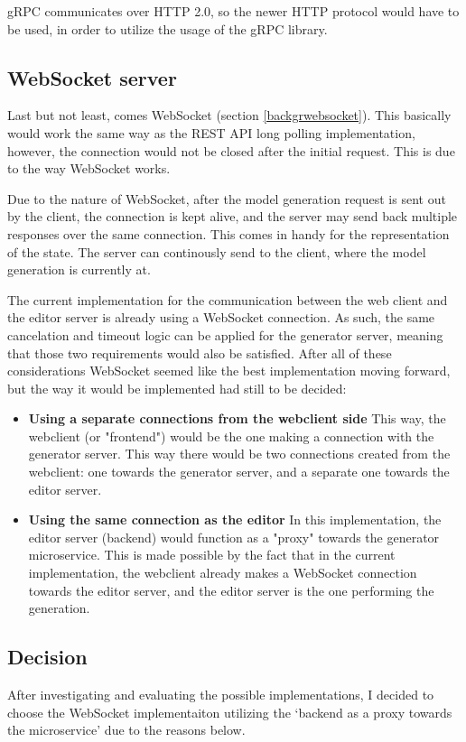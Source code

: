 	gRPC communicates over HTTP 2.0, so the newer HTTP protocol would have to be used, in order to utilize the usage of the gRPC library.

\subsection{WebSocket server} \label{considerationwebsocket}
	Last but not least, comes WebSocket (section \ref{backgrwebsocket}). This basically would work the same way as the REST API long polling implementation,
	however, the connection would not be closed after the initial request. This is due to the way WebSocket works.
	
	Due to the nature of WebSocket, after the model generation request is sent out by the client,
	the connection is kept alive, and the server may send back multiple responses over the same connection.
	This comes in handy for the representation of the state. The server can continously send to the client,
	where the model generation is currently at.

	The current implementation for the communication between the web client and the editor server is already using a WebSocket connection.
	As such, the same cancelation and timeout logic can be applied for the generator server, meaning that those two requirements would also be satisfied.
	After all of these considerations WebSocket seemed like the best implementation moving forward, but the way it would be implemented
	had still to be decided:

	\begin{itemize}
			\item \textbf{Using a separate connections from the webclient side}
			This way, the webclient (or "frontend") would be the one making a connection with the generator server. This way
			there would be two connections created from the webclient: one towards the generator server, and a separate one 
			towards the editor server.

			\item \textbf{Using the same connection as the editor}
			In this implementation, the editor server (backend) would function as a "proxy" towards the generator microservice. This is made possible 
			by the fact that in the current implementation, the webclient already makes a WebSocket connection towards the editor server, and 
			the editor server is the one performing the generation.
	\end{itemize}

\subsection{Decision} \label{archdecision}
	After investigating and evaluating the possible implementations, I decided to choose the WebSocket implementaiton 
	utilizing the `backend as a proxy towards the microservice' due to the reasons below.

